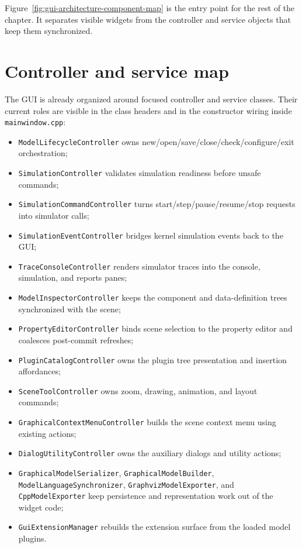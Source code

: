 Figure~\ref{fig:gui-architecture-component-map} is the entry point for the rest of the chapter. It separates visible widgets from the controller and service objects that keep them synchronized.

\section{Controller and service map}
\label{sec:gui-architecture-controller-map}

The GUI is already organized around focused controller and service classes. Their current roles are visible in the class headers and in the constructor wiring inside \texttt{mainwindow.cpp}:
\begin{itemize}
\item \texttt{ModelLifecycleController} owns new/open/save/close/check/configure/exit orchestration;
\item \texttt{SimulationController} validates simulation readiness before unsafe commands;
\item \texttt{SimulationCommandController} turns start/step/pause/resume/stop requests into simulator calls;
\item \texttt{SimulationEventController} bridges kernel simulation events back to the GUI;
\item \texttt{TraceConsoleController} renders simulator traces into the console, simulation, and reports panes;
\item \texttt{ModelInspectorController} keeps the component and data-definition trees synchronized with the scene;
\item \texttt{PropertyEditorController} binds scene selection to the property editor and coalesces post-commit refreshes;
\item \texttt{PluginCatalogController} owns the plugin tree presentation and insertion affordances;
\item \texttt{SceneToolController} owns zoom, drawing, animation, and layout commands;
\item \texttt{GraphicalContextMenuController} builds the scene context menu using existing actions;
\item \texttt{DialogUtilityController} owns the auxiliary dialogs and utility actions;
\item \texttt{GraphicalModelSerializer}, \texttt{GraphicalModelBuilder}, \texttt{ModelLanguageSynchronizer}, \texttt{GraphvizModelExporter}, and \texttt{CppModelExporter} keep persistence and representation work out of the widget code;
\item \texttt{GuiExtensionManager} rebuilds the extension surface from the loaded model plugins.
\end{itemize}


